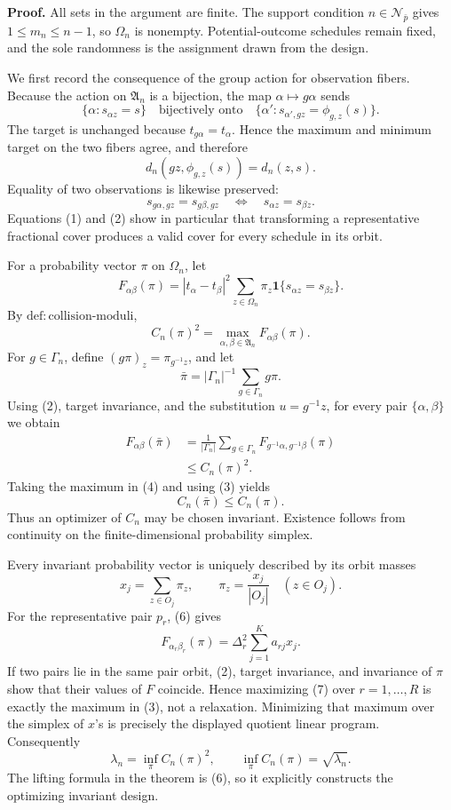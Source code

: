 \textbf{Proof.}
All sets in the argument are finite.  The support condition \(n\in\mathcal N_{\bar p}\) gives \(1\le m_n\le n-1\), so \(\Omega_n\) is nonempty.  Potential-outcome schedules remain fixed, and the sole randomness is the assignment drawn from the design.

We first record the consequence of the group action for observation fibers.  Because the action on \(\mathfrak A_n\) is a bijection, the map \(\alpha\mapsto g\alpha\) sends
\[
 \{\alpha:s_{\alpha z}=s\}
 \quad\text{bijectively onto}\quad
 \{\alpha':s_{\alpha',gz}=\phi_{g,z}(s)\}.
\]
The target is unchanged because \(t_{g\alpha}=t_\alpha\).  Hence the maximum and minimum target on the two fibers agree, and therefore
\[
 d_n(gz,\phi_{g,z}(s))=d_n(z,s). \tag{1}
\]
Equality of two observations is likewise preserved:
\[
 s_{g\alpha,gz}=s_{g\beta,gz}
 \quad\Longleftrightarrow\quad
 s_{\alpha z}=s_{\beta z}. \tag{2}
\]
Equations (1) and (2) show in particular that transforming a representative fractional cover produces a valid cover for every schedule in its orbit.

For a probability vector \(\pi\) on \(\Omega_n\), let
\[
 F_{\alpha\beta}(\pi)
 =|t_\alpha-t_\beta|^2
   \sum_{z\in\Omega_n}\pi_z
   \mathbf 1\{s_{\alpha z}=s_{\beta z}\}.
\]
By \(\mathrm{def{:}collision\text{-}moduli}\),
\[
 C_n(\pi)^2=\max_{\alpha,\beta\in\mathfrak A_n}F_{\alpha\beta}(\pi). \tag{3}
\]
For \(g\in\Gamma_n\), define \((g\pi)_z=\pi_{g^{-1}z}\), and let
\[
 \bar\pi=|\Gamma_n|^{-1}\sum_{g\in\Gamma_n}g\pi.
\]
Using (2), target invariance, and the substitution \(u=g^{-1}z\), for every pair \(\{\alpha,\beta\}\) we obtain
\[
 \begin{aligned}
 F_{\alpha\beta}(\bar\pi)
 &=\frac1{|\Gamma_n|}\sum_{g\in\Gamma_n}
   F_{g^{-1}\alpha,g^{-1}\beta}(\pi)\\
 &\le C_n(\pi)^2.
 \end{aligned} \tag{4}
\]
Taking the maximum in (4) and using (3) yields
\[
 C_n(\bar\pi)\le C_n(\pi). \tag{5}
\]
Thus an optimizer of \(C_n\) may be chosen invariant.  Existence follows from continuity on the finite-dimensional probability simplex.

Every invariant probability vector is uniquely described by its orbit masses
\[
 x_j=\sum_{z\in O_j}\pi_z,
 \qquad
 \pi_z=\frac{x_j}{|O_j|}\quad(z\in O_j). \tag{6}
\]
For the representative pair \(p_r\), (6) gives
\[
 F_{\alpha_r\beta_r}(\pi)
 =\Delta_r^2\sum_{j=1}^K a_{rj}x_j. \tag{7}
\]
If two pairs lie in the same pair orbit, (2), target invariance, and invariance of \(\pi\) show that their values of \(F\) coincide.  Hence maximizing (7) over \(r=1,\ldots,R\) is exactly the maximum in (3), not a relaxation.  Minimizing that maximum over the simplex of \(x\)'s is precisely the displayed quotient linear program.  Consequently
\[
 \lambda_n=\inf_\pi C_n(\pi)^2,
 \qquad
 \inf_\pi C_n(\pi)=\sqrt{\lambda_n}. \tag{8}
\]
The lifting formula in the theorem is (6), so it explicitly constructs the optimizing invariant design.

